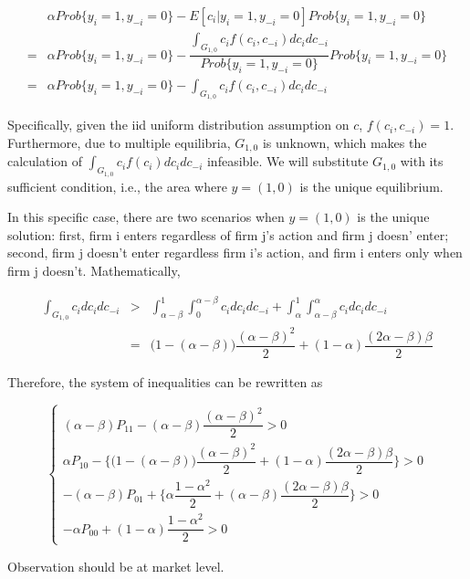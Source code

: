 \documentclass[a4paper]{article}
\begin{document}
$$
\begin{array}{cl}
      &\alpha Prob\{y_i = 1, y_{-i} = 0\} - E[c_i|y_i = 1, y_{-i} = 0]Prob\{y_i = 1, y_{-i} = 0\}\\
    =& \alpha Prob\{y_i = 1, y_{-i} = 0\} - \dfrac{\int_{G_{1,0}}c_if(c_i, c_{-i})dc_idc_{-i}}{Prob\{y_i = 1, y_{-i} = 0\}} Prob\{y_i = 1, y_{-i} = 0\}\\
    =& \alpha Prob\{y_i = 1, y_{-i} = 0\} - \int_{G_{1,0}}c_if(c_i, c_{-i})dc_idc_{-i}
\end{array}
$$

Specifically, given the iid uniform distribution assumption on $c$, $f(c_i, c_{-i}) = 1$. Furthermore, due to multiple equilibria, $G_{1,0}$ is unknown, which makes the calculation of $\int_{G_{1,0}}c_if(c_i)dc_idc_{-i}$ infeasible.  We will substitute $G_{1,0}$ with its sufficient condition, i.e., the area where $y=(1, 0)$ is the unique equilibrium. 

In this specific case, there are two scenarios when $y = (1, 0)$ is the unique solution: first, firm i enters regardless of firm j's action and firm j doesn' enter; second, firm j doesn't enter regardless firm i's action, and firm i enters only when  firm j doesn't. Mathematically,


$$
\begin{array}{rcl}
     \int_{G_{1,0}}c_idc_idc_{-i} 
     & > & \int_{\alpha - \beta}^1\int_{0}^{\alpha - \beta}c_idc_idc_{-i} + \int_\alpha^1\int_{\alpha - \beta}^\alpha c_idc_idc_{-i} \\
     & = &  \big(1 - (\alpha - \beta)\big)\dfrac{(\alpha - \beta)^2}{2} + (1 - \alpha)\dfrac{(2\alpha - \beta)\beta}{2}
\end{array}
$$

Therefore, the system of inequalities can be rewritten as 


$$\begin{cases}
 (\alpha - \beta)P_{11} - (\alpha - \beta)\dfrac{ (\alpha - \beta)^2}{2} > 0\\
 \alpha P_{10} - \{\big(1 - (\alpha - \beta)\big)\dfrac{(\alpha - \beta)^2}{2} + (1 - \alpha)\dfrac{(2\alpha - \beta)\beta}{2}\}> 0\\
- (\alpha - \beta)P_{01} + \{\alpha\dfrac{1 - \alpha^2}{2} + (\alpha- \beta)\dfrac{(2\alpha - \beta)\beta}{2} \}> 0\\
- \alpha P_{00} + (1 - \alpha)\dfrac{1 - \alpha^2}{2} > 0
\end{cases}$$



Observation should be at market level.
\end{document}
